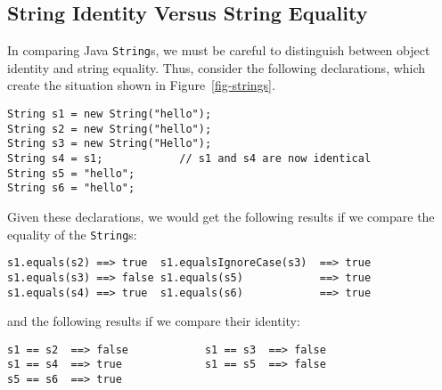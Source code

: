 \subsection{String Identity Versus String Equality}


\noindent In comparing Java {\tt String}s, we must be careful to distinguish
between object identity and string equality.   Thus, consider the
following declarations, which create the situation shown 
in Figure~\ref{fig-strings}.

\begin{figure}[h!]
\end{figure}

\begin{jjjlisting}
\begin{lstlisting}
String s1 = new String("hello");
String s2 = new String("hello");
String s3 = new String("Hello");
String s4 = s1;            // s1 and s4 are now identical
String s5 = "hello";
String s6 = "hello";
\end{lstlisting}
\end{jjjlisting}

\noindent Given these declarations, we would get the
following results if we compare the equality of the {\tt String}s:

\begin{jjjlisting}
\begin{lstlisting}
s1.equals(s2) ==> true  s1.equalsIgnoreCase(s3)  ==> true
s1.equals(s3) ==> false s1.equals(s5)            ==> true
s1.equals(s4) ==> true  s1.equals(s6)            ==> true
\end{lstlisting}
\end{jjjlisting}

\noindent and the following results if we compare their identity:

\begin{jjjlisting}
\begin{lstlisting}
s1 == s2  ==> false            s1 == s3  ==> false
s1 == s4  ==> true             s1 == s5  ==> false
s5 == s6  ==> true
\end{lstlisting}
\end{jjjlisting}

